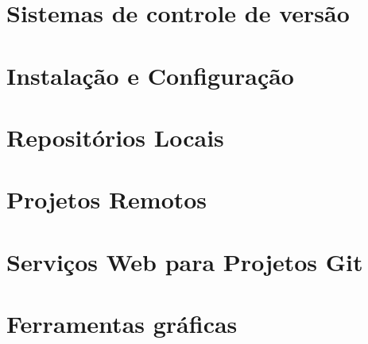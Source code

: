 \documentclass[
  a5paper,
  pagesize,
  9pt,
  pointlessnumbers,
  normalheadings,
  twoside=false
]{book}
\begin{document}
\newpage



\hypersetup{linkcolor=black}
\setcounter{tocdepth}{2}
\tableofcontents


\chapter{Sistemas de controle de versão}


\chapter{Instalação e Configuração}


\chapter{Repositórios Locais}


\chapter{Projetos Remotos}


\chapter{Serviços Web para Projetos Git}


\chapter{Ferramentas gráficas}

% 
% 
% 
\end{document}
